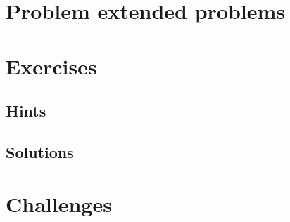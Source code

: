 \section{Problem extended problems}





















\section{Exercises}

\ifdefined\IncludeExerciseHints
\subsection*{Hints}

\fi
\ifdefined\IncludeExerciseSolutions
\subsection*{Solutions}

\fi

\section{Challenges}






